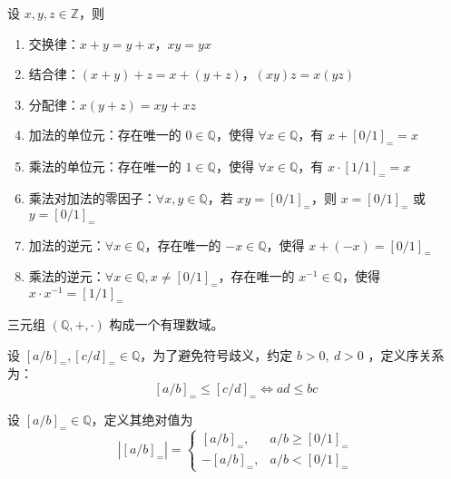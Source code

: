 \vspace{1em}
\begin{theorem}[有理数代数运算的性质]
    设 $x,y,z\in\mathbb{Z}$，则
    \begin{enumerate}
        \item 交换律：$x+y=y+x$，$xy=yx$
        \item 结合律：$(x+y)+z=x+(y+z)$，$(xy)z=x(yz)$
        \item 分配律：$x(y+z)=xy+xz$
        \item 加法的单位元：存在唯一的 $0\in\mathbb{Q}$，使得 $\forall x\in\mathbb{Q}$，有 $x+[0/1]_{=}=x$
        \item 乘法的单位元：存在唯一的 $1\in\mathbb{Q}$，使得 $\forall x\in\mathbb{Q}$，有 $x\cdot[1/1]_{=}=x$
        \item 乘法对加法的零因子：$\forall x,y\in\mathbb{Q}$，若 $xy=[0/1]_{=}$，则 $x=[0/1]_{=}$ 或 $y=[0/1]_{=}$
        \item 加法的逆元：$\forall x\in\mathbb{Q}$，存在唯一的 $-x\in\mathbb{Q}$，使得 $x+(-x)=[0/1]_{=}$
        \item 乘法的逆元：$\forall x\in\mathbb{Q}, x\neq [0/1]_{=}$，存在唯一的 $x^{-1}\in\mathbb{Q}$，使得 $x\cdot x^{-1}=[1/1]_{=}$
    \end{enumerate}
\end{theorem}

\begin{note}
    三元组 $(\mathbb{Q},+,\cdot)$ 构成一个有理数域。
\end{note}

\vspace{1em}

\begin{definition}
    设 $[a/b]_{=},[c/d]_{=}\in\mathbb{Q}$，为了避免符号歧义，约定 $b > 0,\ d > 0$ ，定义序关系为：
    \[
        [a/b]_{=} \leq [c/d]_{=} \iff ad \leq bc
    \]
\end{definition}

\begin{definition}
    设 $[a/b]_{=}\in\mathbb{Q}$，定义其绝对值为
    \[
        |[a/b]_{=}| = 
        \begin{cases}
            [a/b]_{=}, & a/b \geq [0/1]_{=} \\
            -[a/b]_{=}, & a/b < [0/1]_{=}
        \end{cases}
    \]
\end{definition}

